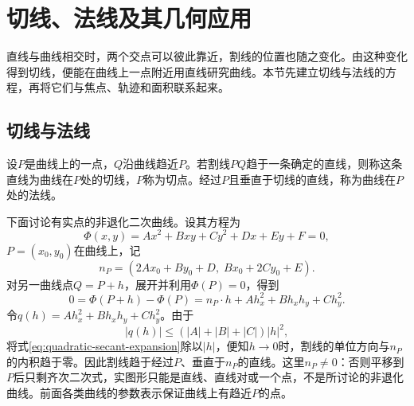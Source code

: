 \newpage
\section{切线、法线及其几何应用}
\label{sec:quadratic-tangents-and-normals}

直线与曲线相交时，两个交点可以彼此靠近，割线的位置也随之变化。由这种变化得到切线，便能在曲线上一点附近用直线研究曲线。本节先建立切线与法线的方程，再将它们与焦点、轨迹和面积联系起来。

\subsection{切线与法线}
\label{subsec:quadratic-tangents-and-normals}

\begin{definition}
设\(P\)是曲线上的一点，\(Q\)沿曲线趋近\(P\)。若割线\(PQ\)趋于一条确定的直线，则称这条直线为曲线在\(P\)处的{\heiti{}切线}，\(P\)称为切点。经过\(P\)且垂直于切线的直线，称为曲线在\(P\)处的{\heiti{}法线}。
\end{definition}

下面讨论有实点的非退化二次曲线。设其方程为
\begin{equation*}
 \Phi(x,y)=Ax^2+Bxy+Cy^2+Dx+Ey+F=0,
\end{equation*}
\(P=(x_0,y_0)\)在曲线上，记
\begin{equation}\label{eq:quadratic-tangent-normal-vector}
 n_P=(2Ax_0+By_0+D,\;Bx_0+2Cy_0+E).
\end{equation}
对另一曲线点\(Q=P+h\)，展开并利用\(\Phi(P)=0\)，得到
\begin{equation}\label{eq:quadratic-secant-expansion}
 0=\Phi(P+h)-\Phi(P)=n_P\cdot h+Ah_x^2+Bh_xh_y+Ch_y^2.
\end{equation}
令\(q(h)=Ah_x^2+Bh_xh_y+Ch_y^2\)。由于
\begin{equation*}
 |q(h)|\le (|A|+|B|+|C|)|h|^2,
\end{equation*}
将式\eqref{eq:quadratic-secant-expansion}除以\(|h|\)，便知\(h\to0\)时，割线的单位方向与\(n_P\)的内积趋于零。因此割线趋于经过\(P\)、垂直于\(n_P\)的直线。这里\(n_P\ne0\)：否则平移到\(P\)后只剩齐次二次式，实图形只能是直线、直线对或一个点，不是所讨论的非退化曲线。前面各类曲线的参数表示保证曲线上有趋近\(P\)的点。

